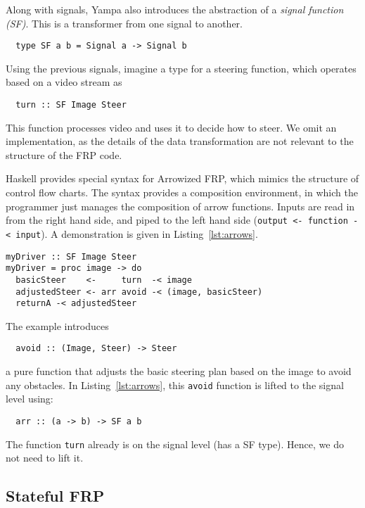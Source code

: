 Along with signals, Yampa also introduces the abstraction of a \textit{signal function (SF)}.
This is a transformer from one signal to another.

\begin{lstlisting}
  type SF a b = Signal a -> Signal b
\end{lstlisting}

\noindent Using the previous signals, imagine a type for a steering function, which operates based on a video stream as

\begin{lstlisting}
  turn :: SF Image Steer
\end{lstlisting}

\noindent This function processes video and uses it to decide how to steer.
We omit an implementation, as the details of the data transformation are not relevant to the structure of the FRP code.

Haskell provides special syntax for Arrowized FRP, which mimics the structure of control flow charts.
The syntax provides a composition environment, in which the programmer just manages the composition of arrow functions.
Inputs are read in from the right hand side, and piped to the left hand side (\texttt{output <- function -< input}).
A demonstration is given in Listing~\ref{lst:arrows}.

\begin{lstlisting}[float,floatplacement=h!,caption=Basic Arrowized FRP syntax,label=lst:arrows]
myDriver :: SF Image Steer
myDriver = proc image -> do
  basicSteer    <-     turn  -< image
  adjustedSteer <- arr avoid -< (image, basicSteer)
  returnA -< adjustedSteer
\end{lstlisting}

The example introduces 
%
\begin{lstlisting}
  avoid :: (Image, Steer) -> Steer
\end{lstlisting}
%
a pure function that adjusts the basic steering plan based on the image to avoid any obstacles.
In Listing~\ref{lst:arrows}, this \texttt{avoid} function is lifted to the signal level using:
%
\begin{lstlisting}
  arr :: (a -> b) -> SF a b
\end{lstlisting}
%
The function \texttt{turn} already is on the signal level (has a SF type). Hence, we do not need to lift it.

\subsection{Stateful FRP}


